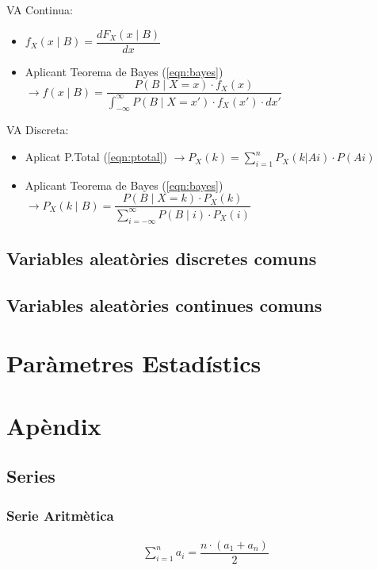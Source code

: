 \documentclass{article}
\begin{document}
VA Continua:
\begin{itemize}
    \item $f_X(x \mid B) = \dfrac{dF_X(x\mid B)}{dx}$
    \item Aplicant Teorema de Bayes (\ref{eqn:bayes}) $\rightarrow f(x\mid B) = \dfrac{P(B\mid X=x)\cdot f_X(x)}{\displaystyle \int_{-\infty}^{\infty} P(B\mid X=x')\cdot f_X(x') \cdot dx'}$
\end{itemize}

VA Discreta:
\begin{itemize}
    \item Aplicat P.Total (\ref{eqn:ptotal}) $\rightarrow P_X(k) = \displaystyle \sum_{i=1}^{n}P_{X}(k|Ai)\cdot P(Ai)$
    \item Aplicant Teorema de Bayes (\ref{eqn:bayes}) $\rightarrow P_{X}(k\mid B) = \dfrac{P(B\mid X=k)\cdot P_X(k)}{\displaystyle \sum_{i=-\infty}^{\infty} P(B\mid i)\cdot P_X(i)}$
\end{itemize}

\subsection{Variables aleatòries discretes comuns}

\subsection{Variables aleatòries continues comuns}

\newpage
\section{Paràmetres Estadístics}

\newpage
\section{Apèndix}

\subsection{Series}

\subsubsection{Serie Aritmètica}\label{eqn:saritmetica}

\begin{align*} 
\sum_{i=1}^{n} a_i = \dfrac{n \cdot (a_1 + a_n)}{2}
\end{align*}
\end{document}
